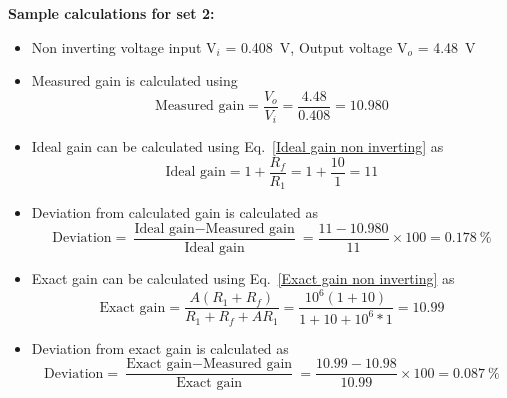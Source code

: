 \documentclass[11pt]{scrreprt}
\begin{document}
\newpage
\noindent\textbf{Sample calculations for set 2:}\\
\begin{itemize}
    \item Non inverting voltage input V$_i$ = 0.408~V, Output voltage V$_o$ = 4.48~V
    \item Measured gain is calculated using 
    \begin{equation}
        \text{Measured gain} = \frac{V_o}{V_i} = \frac{4.48}{0.408} = 10.980
    \end{equation}
    \item Ideal gain can be calculated using Eq.~\ref{Ideal gain non inverting} as
    \begin{equation}
        \text{Ideal gain} = 1 + \frac{R_f}{R_1} = 1+\frac{10}{1} = 11
    \end{equation}
    \item Deviation from calculated gain is calculated as
    \begin{equation}
        \text{Deviation} = \frac{\text{Ideal gain} - \text{Measured gain}}{\text{Ideal gain}} = \frac{11-10.980}{11}\times100 = 0.178~\% 
    \end{equation}
    \item Exact gain can be calculated using Eq.~\ref{Exact gain non inverting} as
    \begin{equation}
        \text{Exact gain} = \frac{A(R_1 + R_f)}{R_1 + R_f + AR_1} = \frac{10^6(1 + 10)}{1+10+10^6*1} = 10.99
    \end{equation}
    \item Deviation from exact gain is calculated as 
    \begin{equation}
        \text{Deviation} = \frac{\text{Exact gain} - \text{Measured gain}}{\text{Exact gain}} = \frac{10.99-10.98}{10.99}\times100 = 0.087~\%
    \end{equation}
\end{itemize}
\end{document}
